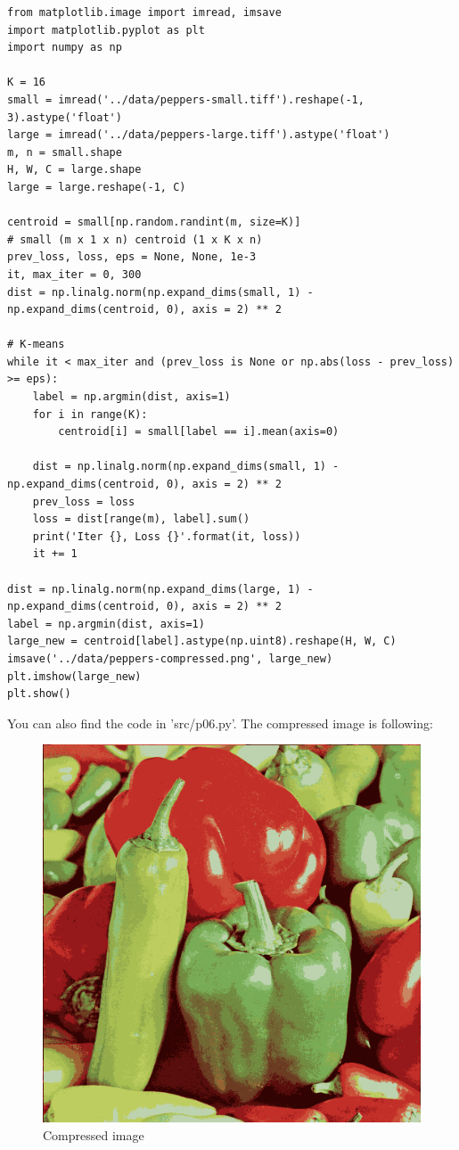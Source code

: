 \begin{answer}
\begin{verbatim}
from matplotlib.image import imread, imsave
import matplotlib.pyplot as plt
import numpy as np

K = 16
small = imread('../data/peppers-small.tiff').reshape(-1, 3).astype('float')
large = imread('../data/peppers-large.tiff').astype('float')
m, n = small.shape
H, W, C = large.shape
large = large.reshape(-1, C)

centroid = small[np.random.randint(m, size=K)]
# small (m x 1 x n) centroid (1 x K x n)
prev_loss, loss, eps = None, None, 1e-3
it, max_iter = 0, 300
dist = np.linalg.norm(np.expand_dims(small, 1) - np.expand_dims(centroid, 0), axis = 2) ** 2

# K-means
while it < max_iter and (prev_loss is None or np.abs(loss - prev_loss) >= eps):
    label = np.argmin(dist, axis=1)
    for i in range(K):
        centroid[i] = small[label == i].mean(axis=0)

    dist = np.linalg.norm(np.expand_dims(small, 1) - np.expand_dims(centroid, 0), axis = 2) ** 2
    prev_loss = loss
    loss = dist[range(m), label].sum()
    print('Iter {}, Loss {}'.format(it, loss))
    it += 1
    
dist = np.linalg.norm(np.expand_dims(large, 1) - np.expand_dims(centroid, 0), axis = 2) ** 2
label = np.argmin(dist, axis=1)
large_new = centroid[label].astype(np.uint8).reshape(H, W, C)
imsave('../data/peppers-compressed.png', large_new)
plt.imshow(large_new)
plt.show()
\end{verbatim}
You can also find the code in 'src/p06.py'. The compressed image is following:
\begin{figure}[htbp] 
	\centering
	\includegraphics[scale=0.5]{tex/05-k_means/peppers-compressed.png}
	\caption{Compressed image}
\end{figure}
\end{answer}
